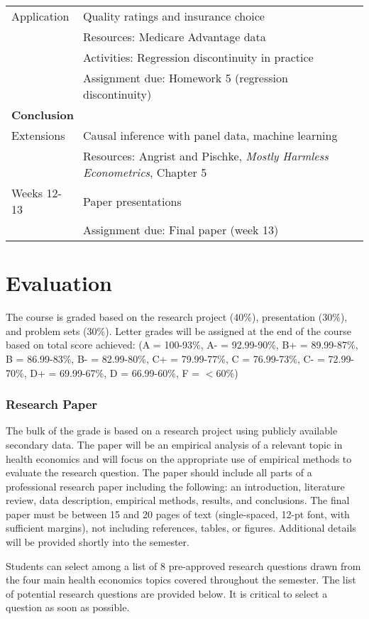 \documentclass{article}
\begin{document}
\begin{longtable}{lp{13cm}}
  \hline
  Application & Quality ratings and insurance choice \\
              & Resources: Medicare Advantage data \\
              & Activities: Regression discontinuity in practice \citep{darden2015} \\
              & Assignment due: Homework 5 (regression discontinuity) \\
  \hline
  \multicolumn{2}{l}{\textbf{Conclusion}} \\
  \hline\hline
  Extensions & Causal inference with panel data, machine learning \\
             & Resources:  Angrist and Pischke, \textit{Mostly Harmless Econometrics}, Chapter 5 \\
  \hline
  Weeks 12-13 & Paper presentations \\
              & Assignment due: Final paper (week 13)
\end{longtable}


\section*{Evaluation}
The course is graded based on the research project (40\%), presentation (30\%), and problem sets (30\%). Letter grades will be assigned at the end of the course based on total score achieved:
(A = 100-93\%, A- = 92.99-90\%, B+ = 89.99-87\%, B = 86.99-83\%, B- = 82.99-80\%, C+ = 79.99-77\%, C = 76.99-73\%, C- = 72.99-70\%, D+ = 69.99-67\%, D = 66.99-60\%, F = $<$60\%)


\subsubsection*{Research Paper}
The bulk of the grade is based on a research project using publicly available secondary data. The paper will be an empirical analysis of a relevant topic in health economics and will focus on the appropriate use of empirical methods to evaluate the research question. The paper should include all parts of a professional research paper including the following:  an introduction, literature review, data description, empirical methods, results, and conclusions. The final paper must be between 15 and 20 pages of text (single-spaced, 12-pt font, with sufficient margins), not including references, tables, or figures. Additional details will be provided shortly into the semester.

Students can select among a list of 8 pre-approved research questions drawn from the four main health economics topics covered throughout the semester. The list of potential research questions are provided below. It is critical to select a question as soon as possible.
\end{document}
